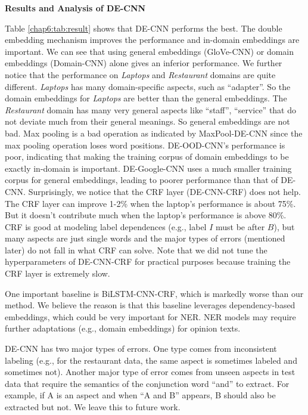 \textbf{Results and Analysis of DE-CNN}

Table \ref{chap6:tab:result} shows that DE-CNN performs the best. 
The double embedding mechanism improves the performance and in-domain embeddings are important. 
We can see that using general embeddings (GloVe-CNN) or domain embeddings (Domain-CNN) alone gives an inferior performance. 
We further notice that the performance on \textit{Laptops} and \textit{Restaurant} domains are quite different. 
\textit{Laptops} has many domain-specific aspects, such as ``adapter''. 
So the domain embeddings for \textit{Laptops} are better than the general embeddings. 
The \textit{Restaurant} domain has many very general aspects like ``staff'', ``service'' that do not deviate much from their general meanings. 
So general embeddings are not bad. 
Max pooling is a bad operation as indicated by MaxPool-DE-CNN since the max pooling operation loses word positions.
DE-OOD-CNN's performance is poor, indicating that making the training corpus of domain embeddings to be exactly in-domain is important.
DE-Google-CNN uses a much smaller training corpus for general embeddings, leading to poorer performance than that of DE-CNN.
Surprisingly, we notice that the CRF layer (DE-CNN-CRF) does not help.
The CRF layer can improve 1-2\% when the laptop's performance is about 75\%.
But it doesn't contribute much when the laptop's performance is above 80\%. 
CRF is good at modeling label dependences (e.g., label $I$ must be after $B$), but many aspects are just single words and the major types of errors (mentioned later) do not fall in what CRF can solve.
Note that we did not tune the hyperparameters of DE-CNN-CRF for practical purposes because training the CRF layer is extremely slow. 

One important baseline is BiLSTM-CNN-CRF, which is markedly worse than our method. 
We believe the reason is that this baseline leverages dependency-based embeddings\cite{levy2014dependency}, 
which could be very important for NER.
NER models may require further adaptations (e.g., domain embeddings) for opinion texts. 

DE-CNN has two major types of errors.
One type comes from inconsistent labeling (e.g., for the restaurant data, the same aspect is sometimes labeled and sometimes not). 
Another major type of error comes from unseen aspects in test data that require the semantics of the conjunction word ``and'' to extract. For example, if A is an aspect and when ``A and B'' appears, B should also be extracted but not.
We leave this to future work.

